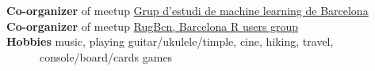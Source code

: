 \documentclass[a4paper, oneside]{scrreprt}
\begin{document}
\noindent\makebox[\linewidth]{\rule{\textwidth}{0.4pt}}

\vspace{0.6cm}


\noindent
\begin{minipage}{0.9\textwidth}
  \noindent\llap{\FA \faCar\ \ }\textbf{Co-organizer} of meetup
  \href{https://www.meetup.com/Grup-destudid-e-machine-learning-de-Barcelona/}
  {Grup d'estudi de machine learning de Barcelona}\\
  \noindent\llap{\FA \faAreaChart\ \ }\textbf{Co-organizer} of meetup
  \href{https://www.meetup.com/RugBcn-Barcelona-R-users-group/}{RugBcn, Barcelona R users group}\\
  \noindent\llap{\FA \faMusic\ \ }\textbf{Hobbies}
  music, playing guitar/ukulele/timple, cine, hiking, travel, \\
  \ \ \ \ \ \ console/board/cards games \\
\end{minipage}\hfill
{}
\ \\
\noindent\makebox[\linewidth]{\rule{\textwidth}{0.4pt}}
\end{document}
